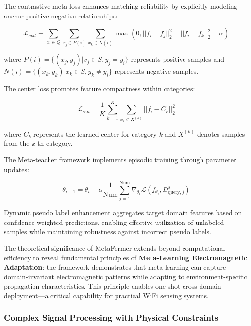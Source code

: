 \documentclass[journal]{IEEEtran}
\begin{document}
The contrastive meta loss enhances matching reliability by explicitly modeling anchor-positive-negative relationships:

\begin{equation}
\mathcal{L}_{cml} = \sum_{x_i \in Q} \sum_{x_j \in P(i)} \sum_{x_k \in N(i)} \max(0, ||f_i - f_j||_2^2 - ||f_i - f_k||_2^2 + \alpha)
\label{eq:metaformer_contrastive_loss}
\end{equation}

where $P(i) = \{(x_j, y_j) | x_j \in S, y_j = y_i\}$ represents positive samples and $N(i) = \{(x_k, y_k) | x_k \in S, y_k \neq y_i\}$ represents negative samples.

The center loss promotes feature compactness within categories:

\begin{equation}
\mathcal{L}_{cen} = \frac{1}{K} \sum_{k=1}^{K} \sum_{x_i \in X^{(k)}} ||f_i - C_k||_2^2
\label{eq:metaformer_center_loss}
\end{equation}

where $C_k$ represents the learned center for category $k$ and $X^{(k)}$ denotes samples from the $k$-th category.

The Meta-teacher framework implements episodic training through parameter updates:

\begin{equation}
\theta_{i+1} = \theta_i - \alpha \frac{1}{\text{Num}} \sum_{j=1}^{\text{Num}} \nabla_{\theta_i} \mathcal{L}(f_{\theta_i}, D^s_{\text{query},j})
\label{eq:metaformer_meta_update}
\end{equation}

Dynamic pseudo label enhancement aggregates target domain features based on confidence-weighted predictions, enabling effective utilization of unlabeled samples while maintaining robustness against incorrect pseudo labels.

The theoretical significance of MetaFormer extends beyond computational efficiency to reveal fundamental principles of \textbf{Meta-Learning Electromagnetic Adaptation}: the framework demonstrates that meta-learning can capture domain-invariant electromagnetic patterns while adapting to environment-specific propagation characteristics. This principle enables one-shot cross-domain deployment—a critical capability for practical WiFi sensing systems.

\subsubsection{Complex Signal Processing with Physical Constraints}
\end{document}
